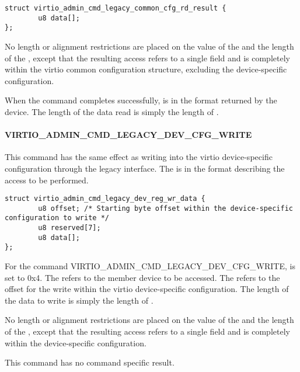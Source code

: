 \begin{lstlisting}
struct virtio_admin_cmd_legacy_common_cfg_rd_result {
        u8 data[];
};
\end{lstlisting}

No length or alignment restrictions are placed on the value of the
 and the length of the , except that the resulting
access refers to a single field and is completely within the virtio common
configuration structure, excluding the device-specific configuration.

When the command completes successfully, 
is in the format 
returned by the device. The length of the data read is simply the length of
.

\paragraph{VIRTIO_ADMIN_CMD_LEGACY_DEV_CFG_WRITE}
\label{par:Basic Facilities of a Virtio Device / Device groups / Group administration commands / Legacy Interface / VIRTIO-ADMIN-CMD-LEGACY-DEV-CFG-WRITE}

This command has the same effect as writing into the virtio device-specific
configuration through the legacy interface. The  is in
the format  describing
the access to be performed.

\begin{lstlisting}
struct virtio_admin_cmd_legacy_dev_reg_wr_data {
        u8 offset; /* Starting byte offset within the device-specific configuration to write */
        u8 reserved[7];
        u8 data[];
};
\end{lstlisting}

For the command VIRTIO_ADMIN_CMD_LEGACY_DEV_CFG_WRITE, 
is set to 0x4.
The  refers to the member device to be accessed.
The  refers to the offset for the write within the virtio
device-specific configuration. The length of the data to write is simply
the length of .

No length or alignment restrictions are placed on the value of the
 and the length of the , except that the resulting
access refers to a single field and is completely within the device-specific
configuration.

This command has no command specific result.


